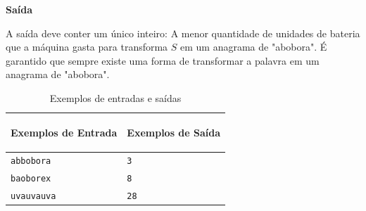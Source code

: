 \vspace{0.3cm}
\textbf{Saída}

A saída deve conter um único inteiro: A menor quantidade de unidades de bateria que a máquina gasta para transforma $S$ em um anagrama de "abobora". É garantido que sempre existe uma forma de transformar a palavra em um anagrama de "abobora".

\begin{table}[h]
    \centering
    \begin{tabular}{|p{7cm}|p{7cm}|}
        \hline
        \begin{center}
            \vspace{-0.3cm}
            \textbf{Exemplos de Entrada}
            \vspace{-0.3cm}
        \end{center} 
         &  
        \begin{center}
            \vspace{-0.3cm}
            \textbf{Exemplos de Saída}
            \vspace{-0.3cm}
        \end{center} \\ \hline
        \texttt{abbobora} & \texttt{3} \\ \hline
        \texttt{baoborex} & \texttt{8} \\ \hline
        \texttt{uvauvauva} & \texttt{28} \\ \hline
    \end{tabular}
    \caption{Exemplos de entradas e saídas}
    \label{tab:inputc2}
\end{table}

\newpage

\begin{center}
\noindent

\end{center}
